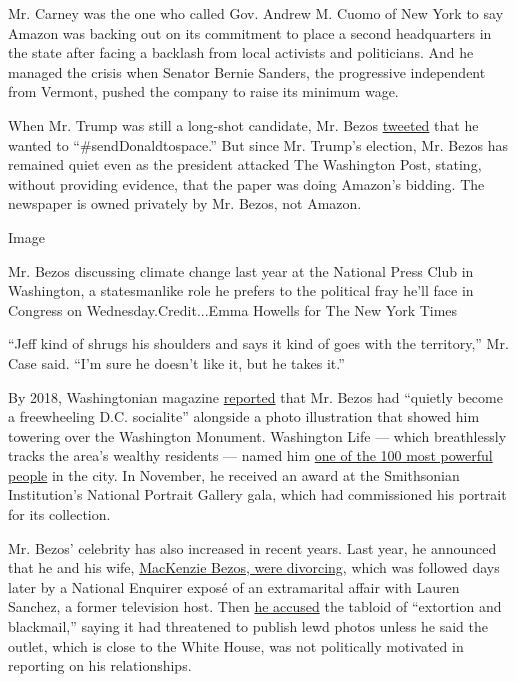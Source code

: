 Mr. Carney was the one who called Gov. Andrew M. Cuomo of New York to
say Amazon was backing out on its commitment to place a second
headquarters in the state after facing a backlash from local activists
and politicians. And he managed the crisis when Senator Bernie Sanders,
the progressive independent from Vermont, pushed the company to raise
its minimum wage.

When Mr. Trump was still a long-shot candidate, Mr. Bezos
\href{https://twitter.com/JeffBezos/status/674008204838199297}{tweeted}
that he wanted to ``\#sendDonaldtospace.'' But since Mr. Trump's
election, Mr. Bezos has remained quiet even as the president attacked
The Washington Post, stating, without providing evidence, that the paper
was doing Amazon's bidding. The newspaper is owned privately by Mr.
Bezos, not Amazon.

Image

Mr. Bezos discussing climate change last year at the National Press Club
in Washington, a statesmanlike role he prefers to the political fray
he'll face in Congress on Wednesday.Credit...Emma Howells for The New
York Times

``Jeff kind of shrugs his shoulders and says it kind of goes with the
territory,'' Mr. Case said. ``I'm sure he doesn't like it, but he takes
it.''

By 2018, Washingtonian magazine
\href{https://www.washingtonian.com/2018/04/22/inside-jeff-bezos-dc-life/}{reported}
that Mr. Bezos had ``quietly become a freewheeling D.C. socialite''
alongside a photo illustration that showed him towering over the
Washington Monument. Washington Life --- which breathlessly tracks the
area's wealthy residents --- named him
\href{https://washingtonlife.com/2018/05/10/business-real-estate-jeff-bezos/}{one
of the 100 most powerful people} in the city. In November, he received
an award at the Smithsonian Institution's National Portrait Gallery
gala, which had commissioned his portrait for its collection.

Mr. Bezos' celebrity has also increased in recent years. Last year, he
announced that he and his wife,
\href{https://www.nytimes.com/2019/05/28/us/mackenzie-bezos-charity.html}{MacKenzie
Bezos, were divorcing}, which was followed days later by a National
Enquirer exposé of an extramarital affair with Lauren Sanchez, a former
television host. Then
\href{https://www.nytimes.com/2019/02/07/technology/jeff-bezos-sanchez-enquirer.html}{he
accused} the tabloid of ``extortion and blackmail,'' saying it had
threatened to publish lewd photos unless he said the outlet, which is
close to the White House, was not politically motivated in reporting on
his relationships.

